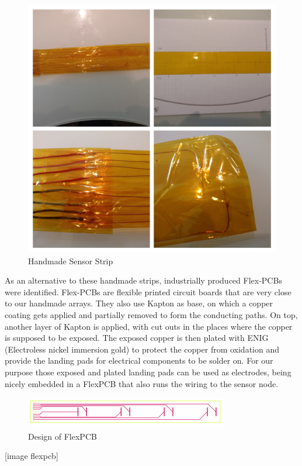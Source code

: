 \begin{figure}
	\begin{center}
		\includegraphics[width=\textwidth]{images/v2.jpg} 
		\caption{Handmade Sensor Strip}
		\label{fig:v2}
	\end{center}
\end{figure}

As an alternative to these handmade strips, industrially produced Flex-PCBs were identified. Flex-PCBs are flexible printed circuit boards that are very close to our handmade arrays. They also use Kapton as base, on which a copper coating gets applied and partially removed to form the conducting paths. On top, another layer of Kapton is applied, with cut outs in the places where the copper is supposed to be exposed. The exposed copper is then plated with ENIG (Electroless nickel immersion gold) to protect the copper from oxidation and provide the landing pads for electrical components to be solder on.
For our purpose those exposed and plated landing pads can be used as electrodes, being nicely embedded in a FlexPCB that also runs the wiring to the sensor node.

\begin{figure}
	\begin{center}
		\includegraphics[width=\textwidth]{images/fpcbd.pdf} 
		\caption{Design of FlexPCB}
		\label{fig:fpcbd}
	\end{center}
\end{figure}
[image flexpcb]

